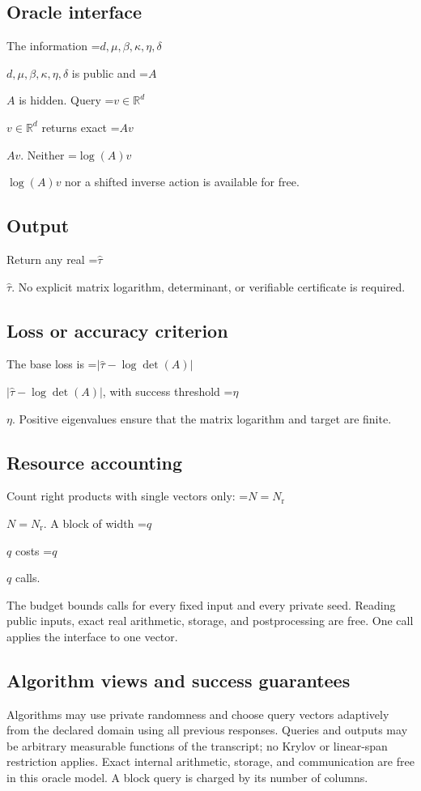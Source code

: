 \documentclass[10pt,a4paper]{article}
\newcommand{\AtlasMath}[1]{\par\begingroup\centering\setbox0=\hbox{$\displaystyle #1$}\ifdim\wd0>1.4\linewidth\typeout{ATLAS WIDE FORMULA: \the\wd0}\fi\ifdim\wd0>\linewidth\resizebox{\linewidth}{!}{\box0}\else\box0\fi\par\endgroup}
\newcommand{\AtlasInlineMath}[1]{\begingroup\setbox0=\hbox{$#1$}\ifdim\wd0>.4\linewidth\endgroup\AtlasMath{#1}\else\endgroup$#1$\fi}
\begin{document}
\subsection{Oracle interface}
The information \AtlasInlineMath{d,\mu,\beta,\kappa,\eta,\delta} is public and \AtlasInlineMath{A} is hidden. Query \AtlasInlineMath{v\in\mathbb{R}^d} returns exact \AtlasInlineMath{Av}. Neither \AtlasInlineMath{\log(A)v} nor a shifted inverse action is available for free.

\subsection{Output}
Return any real \AtlasInlineMath{\widehat\tau}. No explicit matrix logarithm, determinant, or verifiable certificate is required.

\subsection{Loss or accuracy criterion}
The base loss is \AtlasInlineMath{|\widehat\tau-\log\det(A)|}, with success threshold \AtlasInlineMath{\eta}. Positive eigenvalues ensure that the matrix logarithm and target are finite.

\subsection{Resource accounting}
Count right products with single vectors only: \AtlasInlineMath{N=N_{\mathrm r}}. A block of width \AtlasInlineMath{q} costs \AtlasInlineMath{q} calls.

The budget bounds calls for every fixed input and every private seed. Reading public inputs, exact real arithmetic, storage, and postprocessing are free. One call applies the interface to one vector.

\subsection{Algorithm views and success guarantees}
Algorithms may use private randomness and choose query vectors adaptively from the declared domain using all previous responses. Queries and outputs may be arbitrary measurable functions of the transcript; no Krylov or linear-span restriction applies. Exact internal arithmetic, storage, and communication are free in this oracle model. A block query is charged by its number of columns.
\end{document}
